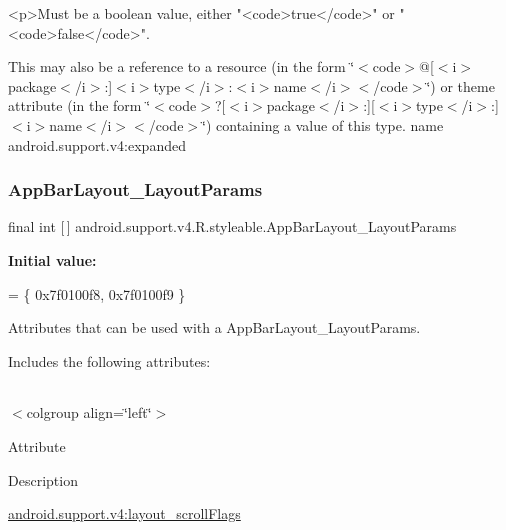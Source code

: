 \begin{DoxyVerb}      <p>Must be a boolean value, either "<code>true</code>" or "<code>false</code>".
\end{DoxyVerb}
 

This may also be a reference to a resource (in the form \char`\"{}$<$code$>$@\mbox{[}$<$i$>$package$<$/i$>$\+:\mbox{]}$<$i$>$type$<$/i$>$\+:$<$i$>$name$<$/i$>$$<$/code$>$\char`\"{}) or theme attribute (in the form \char`\"{}$<$code$>$?\mbox{[}$<$i$>$package$<$/i$>$\+:\mbox{]}\mbox{[}$<$i$>$type$<$/i$>$\+:\mbox{]}$<$i$>$name$<$/i$>$$<$/code$>$\char`\"{}) containing a value of this type.  name android.\+support.\+v4\+:expanded \mbox{\label{classandroid_1_1support_1_1v4_1_1R_1_1styleable_a08b2a4151f7d2667720f413dc2243694}} 
\subsubsection{\texorpdfstring{App\+Bar\+Layout\+\_\+\+Layout\+Params}{AppBarLayout\_LayoutParams}}
{\footnotesize\ttfamily final int \mbox{[}$\,$\mbox{]} android.\+support.\+v4.\+R.\+styleable.\+App\+Bar\+Layout\+\_\+\+Layout\+Params\hspace{0.3cm}{\ttfamily [static]}}

{\bfseries Initial value\+:}
\begin{DoxyCode}
= \{
            0x7f0100f8, 0x7f0100f9
        \}
\end{DoxyCode}
Attributes that can be used with a App\+Bar\+Layout\+\_\+\+Layout\+Params. 

Includes the following attributes\+:

\tabulinesep=1mm
\begin{longtabu} spread 0pt [c]{*{0}{|X[-1]}|}
\hline
\end{longtabu}
$<$colgroup align=\char`\"{}left\char`\"{}$>$ 

Attribute

Description 

{\ttfamily \hyperlink{classandroid_1_1support_1_1v4_1_1R_1_1styleable_a23c156548a9ddc6f6a61cd5d84570527}{android.\+support.\+v4\+:layout\+\_\+scroll\+Flags}}

